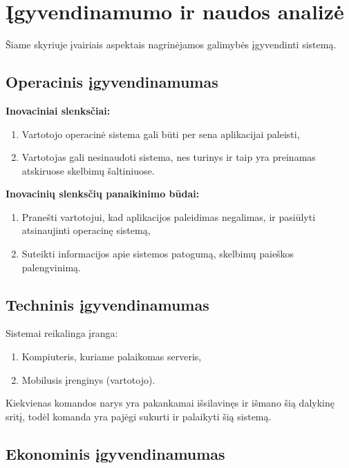 \documentclass[12pt]{article}
\begin{document}
	\section{Įgyvendinamumo ir naudos analizė}
	
	Šiame skyriuje įvairiais aspektais nagrinėjamos galimybės įgyvendinti sistemą.
	
	\subsection{Operacinis įgyvendinamumas}
	
	\textbf{Inovaciniai slenksčiai:}
	\begin{enumerate}
		\item{Vartotojo operacinė sistema gali būti per sena aplikacijai paleisti,}
		\item{Vartotojas gali nesinaudoti sistema, nes turinys ir taip yra preinamas atskiruose skelbimų šaltiniuose.}
	\end{enumerate}
	
	\textbf{Inovacinių slenksčių panaikinimo būdai:}
	\begin{enumerate}
		\item{Pranešti vartotojui, kad aplikacijos paleidimas negalimas, ir pasiūlyti atsinaujinti operacinę sistemą,}
		\item{Suteikti informacijos apie sistemos patogumą, skelbimų paieškos palengvinimą.}
	\end{enumerate}
	
	
	\subsection{Techninis įgyvendinamumas}
	Sistemai reikalinga įranga:
	\begin{enumerate}
		\item{Kompiuteris, kuriame palaikomas serveris,}
		\item{Mobilusis įrenginys (vartotojo).}
	\end{enumerate}
	
	Kiekvienas komandos narys yra pakankamai išsilavinęs ir išmano šią dalykinę sritį, todėl komanda yra pajėgi sukurti ir palaikyti šią sistemą.
	\pagebreak
	
	\subsection{Ekonominis įgyvendinamumas}
	
\end{document}
